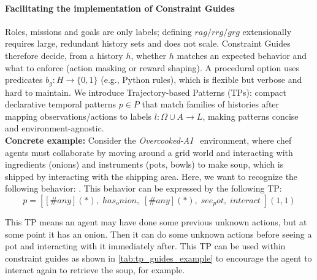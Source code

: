 \documentclass[pdflatex,sn-mathphys-num]{sn-jnl}%
\theoremstyle{thmstyleone}%
\theoremstyle{thmstyletwo}%
\theoremstyle{thmstylethree}%
\begin{document}
\paragraph*{\textbf{Facilitating the implementation of Constraint Guides}}

Roles, missions and goals are only labels; defining \(rag/rrg/grg\) extensionally requires large, redundant history sets and does not scale. Constraint Guides therefore decide, from a history \(h\), whether \(h\) matches an expected behavior and what to enforce (action masking or reward shaping). A procedural option uses predicates \(b_g: H \to \{0,1\}\) (e.g., Python rules), which is flexible but verbose and hard to maintain. We introduce Trajectory-based Patterns (TPs): compact declarative temporal patterns \(p\in P\) that match families of histories after mapping observations/actions to labels \(l:\Omega\cup A\to L\), making patterns concise and environment-agnostic.\\

\noindent \textbf{Concrete example: } Consider the \textit{Overcooked-AI}~\cite{overcookedai} environment, where chef agents must collaborate by moving around a grid world and interacting with ingredients (onions) and instruments (pots, bowls) to make soup, which is shipped by interacting with the shipping area. Here, we want to recognize the following behavior: . This behavior can be expressed by the following TP:
\[
    p = [[\#any](*) , \; has_onion , \; [\#any](*) , \; see_pot , \; interact \;](1,1)
\]

\noindent
This TP means an agent may have done some previous unknown actions, but at some point it has an onion. Then it can do some unknown actions before seeing a pot and interacting with it immediately after. This TP can be used within constraint guides as shown in \autoref{tab:tp_guides_example} to encourage the agent to interact again to retrieve the soup, for example.
\end{document}
